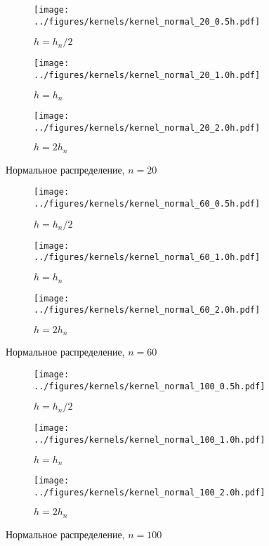 \documentclass[12pt]{report}
\begin{document}
	\begin{figure}[H]
		\centering
		\begin{subfigure}[t]{.3\linewidth}
			\centering\texttt{[image: ../figures/kernels/kernel\_normal\_20\_0.5h.pdf]}
			\caption*{$h = h_n/2$}
		\end{subfigure}
		\begin{subfigure}[t]{.3\linewidth}
			\centering\texttt{[image: ../figures/kernels/kernel\_normal\_20\_1.0h.pdf]}
			\caption*{$h = h_n$}
		\end{subfigure}
		\begin{subfigure}[t]{.3\linewidth}
			\centering\texttt{[image: ../figures/kernels/kernel\_normal\_20\_2.0h.pdf]}
			\caption*{$h = 2h_n$}
		\end{subfigure}
		\caption{Нормальное распределение, $n = 20$}
	\end{figure}
	\begin{figure}[H]
		\centering
		\begin{subfigure}[t]{.3\linewidth}
			\centering\texttt{[image: ../figures/kernels/kernel\_normal\_60\_0.5h.pdf]}
			\caption*{$h = h_n/2$}
		\end{subfigure}
		\begin{subfigure}[t]{.3\linewidth}
			\centering\texttt{[image: ../figures/kernels/kernel\_normal\_60\_1.0h.pdf]}
			\caption*{$h = h_n$}
		\end{subfigure}
		\begin{subfigure}[t]{.3\linewidth}
			\centering\texttt{[image: ../figures/kernels/kernel\_normal\_60\_2.0h.pdf]}
			\caption*{$h = 2h_n$}
		\end{subfigure}
		\caption{Нормальное распределение, $n = 60$}
	\end{figure}
	\begin{figure}[H]
		\centering
		\begin{subfigure}[t]{.3\linewidth}
			\centering\texttt{[image: ../figures/kernels/kernel\_normal\_100\_0.5h.pdf]}
			\caption*{$h = h_n/2$}
		\end{subfigure}
		\begin{subfigure}[t]{.3\linewidth}
			\centering\texttt{[image: ../figures/kernels/kernel\_normal\_100\_1.0h.pdf]}
			\caption*{$h = h_n$}
		\end{subfigure}
		\begin{subfigure}[t]{.3\linewidth}
			\centering\texttt{[image: ../figures/kernels/kernel\_normal\_100\_2.0h.pdf]}
			\caption*{$h = 2h_n$}
		\end{subfigure}
		\caption{Нормальное распределение, $n = 100$}
	\end{figure}
\end{document}

